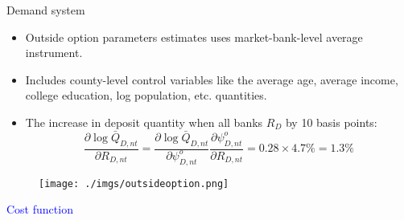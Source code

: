 \documentclass[notes,11pt, aspectratio=169]{beamer}
\begin{document}
      \begin{frame}{Demand system}
        \vspace{0.3cm}
          \begin{itemize}
            \item  Outside option parameters estimates uses market-bank-level average instrument. 
            \item Includes county-level control variables like the average age, average income, college education,
            log population, etc. %
            quantities.

                       \item The increase in deposit quantity when all banks $R_D$ by 10 basis points:
                       $$
                       \frac{\partial \log \bar{Q}_{D, n t}}{\partial R_{D, n t}}=\frac{\partial \log \bar{Q}_{D, n t}}{\partial \psi_{D, n t}^o} \frac{\partial \psi_{D, n t}^o}{\partial R_{D, n t}}=0.28 \times 4.7 \%=1.3 \%
                       $$
          \end{itemize}
          
            \begin{figure}[t*]
              \centering
        
              \texttt{[image: ./imgs/outsideoption.png]}
           
            \end{figure}
    
 
          \end{frame}
    


\begin{frame}
    \textcolor{blue}{\huge{\centerline{Cost function}}}
\end{frame}
\end{document}
